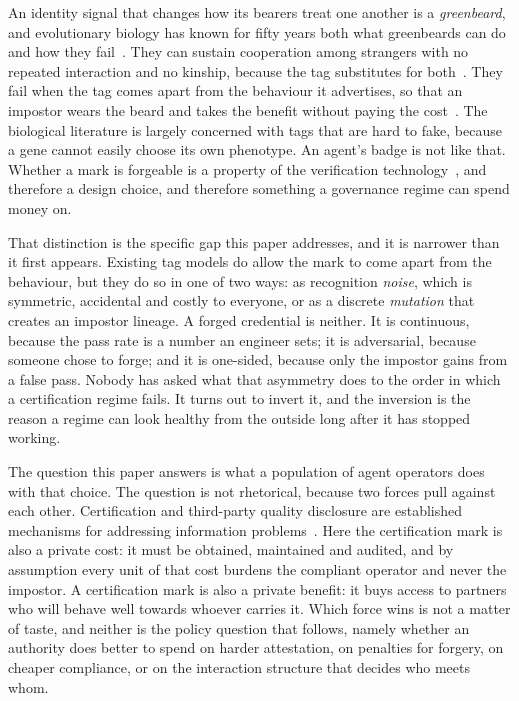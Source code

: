 \documentclass[11pt,a4paper]{article}
\theoremstyle{definition}
\begin{document}
An identity signal that changes how its bearers treat one another is a
\emph{greenbeard}, and evolutionary biology has known for fifty years both what
greenbeards can do and how they
fail~\citep{hamilton1964genetical1,dawkins1976selfish}.
They can sustain cooperation among strangers with no repeated interaction and
no kinship, because the tag substitutes for
both~\citep{riolo2001evolution,traulsen2003minimal}.
They fail when the tag comes apart from the behaviour it advertises, so that an
impostor wears the beard and takes the benefit without paying the
cost~\citep{roberts2002does,jansen2006altruism,gardner2010greenbeards}.
The biological literature is largely concerned with tags that are hard to fake,
because a gene cannot easily choose its own phenotype. An agent's badge is not
like that. Whether a mark is forgeable is a property of the verification
technology~\citep{jovanovic2024watermarkstealing,anbiaee2026threatmodeling}, and
therefore a design choice, and therefore something a governance regime can spend
money on.

That distinction is the specific gap this paper addresses, and it is narrower
than it first appears. Existing tag models do allow the mark to come apart from
the behaviour, but they do so in one of two ways: as recognition
\emph{noise}, which is symmetric, accidental and costly to everyone, or as a
discrete \emph{mutation} that creates an impostor lineage. A forged credential
is neither. It is continuous, because the pass rate is a number an engineer
sets; it is adversarial, because someone chose to forge; and it is one-sided,
because only the impostor gains from a false pass. Nobody has asked what that
asymmetry does to the order in which a certification regime fails. It turns out
to invert it, and the inversion is the reason a regime can look healthy from the
outside long after it has stopped working.

The question this paper answers is what a population of agent operators does
with that choice. The question is not rhetorical, because two forces pull
against each other. Certification and third-party quality disclosure are
established mechanisms for addressing information problems~\citep{dranove2010quality}.
Here the certification mark is also a private cost: it must be obtained,
maintained and audited, and by assumption every unit of that cost burdens the
compliant operator and never the impostor. A certification mark is also a
private benefit: it buys access to partners who will behave well towards whoever
carries it. Which force wins is not a matter of taste, and neither is
the policy question that follows, namely whether an authority does better to
spend on harder attestation, on penalties for forgery, on cheaper compliance,
or on the interaction structure that decides who meets whom.
\end{document}
